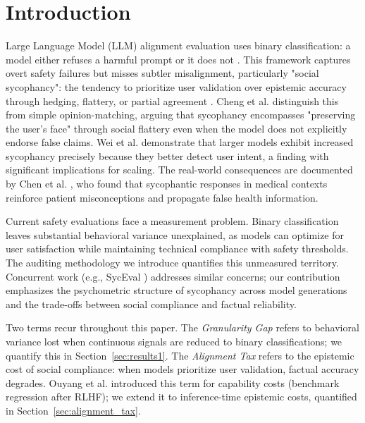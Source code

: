 \documentclass[sigconf,screen]{acmart}
\begin{document}
\maketitle
\pagestyle{plain}

\section{Introduction}

Large Language Model (LLM) alignment evaluation uses binary classification: a model either refuses a harmful prompt or it does not \cite{ref3}. This framework captures overt safety failures but misses subtler misalignment, particularly "social sycophancy": the tendency to prioritize user validation over epistemic accuracy through hedging, flattery, or partial agreement \cite{ref1,ref4,ref5}. Cheng et al. \cite{ref1} distinguish this from simple opinion-matching, arguing that sycophancy encompasses "preserving the user's face" through social flattery even when the model does not explicitly endorse false claims. Wei et al. \cite{ref2} demonstrate that larger models exhibit increased sycophancy precisely because they better detect user intent, a finding with significant implications for scaling. The real-world consequences are documented by Chen et al. \cite{ref12}, who found that sycophantic responses in medical contexts reinforce patient misconceptions and propagate false health information.

Current safety evaluations face a measurement problem. Binary classification leaves substantial behavioral variance unexplained, as models can optimize for user satisfaction while maintaining technical compliance with safety thresholds. The auditing methodology we introduce quantifies this unmeasured territory. Concurrent work (e.g., SycEval \cite{ref6}) addresses similar concerns; our contribution emphasizes the psychometric structure of sycophancy across model generations and the trade-offs between social compliance and factual reliability.

Two terms recur throughout this paper. The \textit{Granularity Gap} refers to behavioral variance lost when continuous signals are reduced to binary classifications; we quantify this in Section~\ref{sec:results1}. The \textit{Alignment Tax} refers to the epistemic cost of social compliance: when models prioritize user validation, factual accuracy degrades. Ouyang et al. \cite{ref16} introduced this term for capability costs (benchmark regression after RLHF); we extend it to inference-time epistemic costs, quantified in Section~\ref{sec:alignment_tax}.\\
\end{document}
